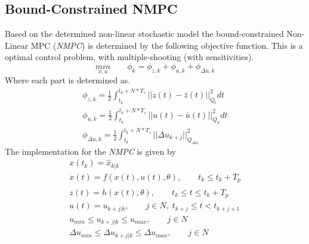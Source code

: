 \subsection{Bound-Constrained NMPC}
Based on the determined non-linear stochastic model the bound-constrained Non-Linear MPC (\textit{NMPC}) is determined by the following objective function. This is a optimal control problem, with multiple-shooting (with sensitivities).
\begin{equation}
    \underset{x,u}{min}\qquad \phi_k=\phi_{z,k}+\phi_{u,k}+\phi_{\Delta u,k}
\end{equation}
Where each part is determined as.
\begin{equation}
    \begin{gathered}
        \phi_{z,k}=\frac{1}{2}\int^{t_k+N*T_s}_{t_k}||z(t)-\bar{z}(t)||^2_{Q_t}dt\\
        \phi_{u,k}=\frac{1}{2}\int^{t_k+N*T_s}_{t_k}||u(t)-\bar{u}(t)||^2_{Q_u}dt\\
        \phi_{\Delta u,k}=\frac{1}{2}\int^{t_k+N*T_s}_{t_k}||\Delta u_{k+j}||^2_{Q_{\Delta u}}
    \end{gathered}
\end{equation}
The implementation for the \textit{NMPC} is given by
\begin{equation}
    \begin{gathered}
        x(t_k)=\hat{x}_{k|k}\\
        \dot{x}(t)=f(x(t),u(t),\theta),\qquad t_k\leq t_k+T_p\\
        z(t)=\dot{h}(x(t),\theta),\qquad t_k\leq t\leq t_k+T_p\\
        u(t)=u_{k+j|k},\qquad j\in N,\;t_{k+j}\leq t<t_{k+j+1}\\
        u_{min}\leq u_{k+j|k}\leq u_{max},\qquad j\in N\\
        \Delta u_{min}\leq \Delta u_{k+j|k}\leq \Delta u_{max},\qquad j\in N\\
    \end{gathered}
\end{equation}
